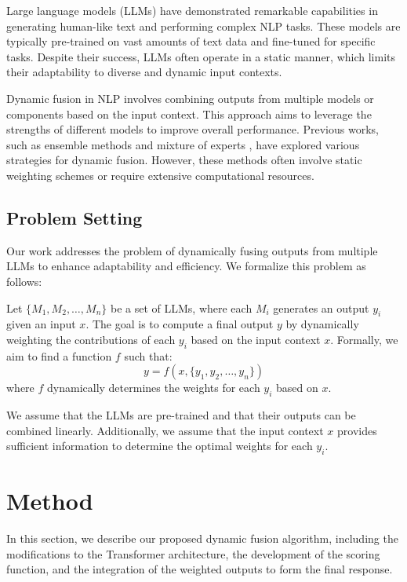\documentclass{article} %
\begin{document}
Large language models (LLMs) have demonstrated remarkable capabilities in generating human-like text and performing complex NLP tasks. These models are typically pre-trained on vast amounts of text data and fine-tuned for specific tasks. Despite their success, LLMs often operate in a static manner, which limits their adaptability to diverse and dynamic input contexts.

Dynamic fusion in NLP involves combining outputs from multiple models or components based on the input context. This approach aims to leverage the strengths of different models to improve overall performance. Previous works, such as ensemble methods \citep{Dietterich2007EnsembleMI} and mixture of experts \citep{Shazeer2017OutrageouslyLN}, have explored various strategies for dynamic fusion. However, these methods often involve static weighting schemes or require extensive computational resources.

\subsection{Problem Setting}
\label{sec:problem_setting}

Our work addresses the problem of dynamically fusing outputs from multiple LLMs to enhance adaptability and efficiency. We formalize this problem as follows:

Let $\{M_1, M_2, \ldots, M_n\}$ be a set of LLMs, where each $M_i$ generates an output $y_i$ given an input $x$. The goal is to compute a final output $y$ by dynamically weighting the contributions of each $y_i$ based on the input context $x$. Formally, we aim to find a function $f$ such that:
\[
y = f(x, \{y_1, y_2, \ldots, y_n\})
\]
where $f$ dynamically determines the weights for each $y_i$ based on $x$.

We assume that the LLMs are pre-trained and that their outputs can be combined linearly. Additionally, we assume that the input context $x$ provides sufficient information to determine the optimal weights for each $y_i$.

\section{Method}
\label{sec:method}

In this section, we describe our proposed dynamic fusion algorithm, including the modifications to the Transformer architecture, the development of the scoring function, and the integration of the weighted outputs to form the final response.
\end{document}
